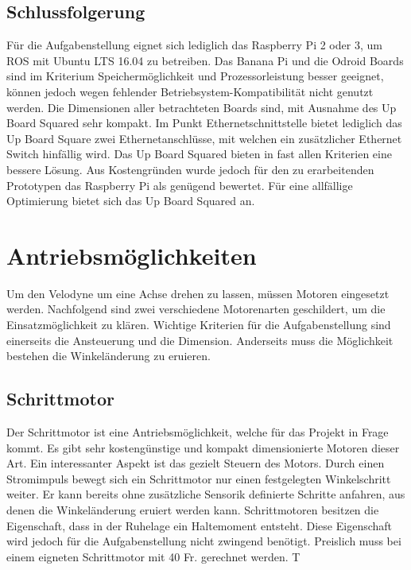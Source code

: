\subsection{Schlussfolgerung}
\label{subsec:Schlussfolgerung}
Für die Aufgabenstellung eignet sich lediglich das Raspberry Pi 2 oder 3, um ROS mit Ubuntu LTS 16.04 zu betreiben. Das Banana Pi und die Odroid Boards sind im Kriterium Speichermöglichkeit und Prozessorleistung besser geeignet, können jedoch wegen fehlender Betriebsystem-Kompatibilität nicht genutzt werden. Die Dimensionen aller betrachteten Boards sind, mit Ausnahme des Up Board Squared sehr kompakt. Im Punkt Ethernetschnittstelle bietet lediglich das Up Board Square zwei Ethernetanschlüsse, mit welchen ein zusätzlicher Ethernet Switch hinfällig wird. Das Up Board Squared bieten in fast allen Kriterien eine bessere Lösung. Aus Kostengründen wurde jedoch für den zu erarbeitenden Prototypen das Raspberry Pi als genügend bewertet. Für eine allfällige Optimierung bietet sich das Up Board Squared an.

\section{Antriebsmöglichkeiten}
\label{sec:Antriebsmoeglichkeiten}
Um den Velodyne um eine Achse drehen zu lassen, müssen Motoren eingesetzt werden. Nachfolgend sind zwei verschiedene Motorenarten geschildert, um die Einsatzmöglichkeit zu klären. Wichtige Kriterien für die Aufgabenstellung sind einerseits die Ansteuerung und die Dimension. Anderseits muss die Möglichkeit bestehen die Winkeländerung zu eruieren. 

\subsection{Schrittmotor}
\label{subsec:Schrittmotor}
Der Schrittmotor ist eine Antriebsmöglichkeit, welche für das Projekt in Frage kommt. Es gibt sehr kostengünstige und kompakt dimensionierte Motoren dieser Art. Ein interessanter Aspekt ist das gezielt Steuern des Motors. Durch einen Stromimpuls bewegt sich ein Schrittmotor nur einen festgelegten Winkelschritt weiter. Er kann bereits ohne zusätzliche Sensorik definierte Schritte anfahren, aus denen die Winkeländerung eruiert werden kann. Schrittmotoren besitzen die Eigenschaft, dass in der Ruhelage ein Haltemoment entsteht. Diese Eigenschaft wird jedoch für die Aufgabenstellung nicht zwingend benötigt. Preislich muss bei einem eigneten Schrittmotor mit 40 Fr. gerechnet werden. T 

